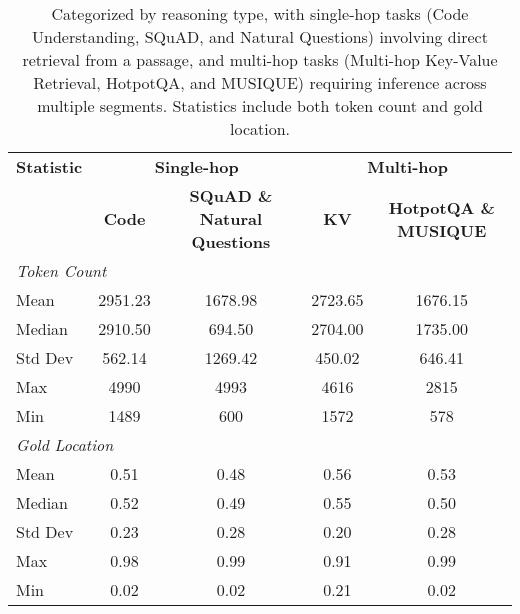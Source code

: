 \begin{table}[ht]
\centering
\small
\begin{tabular}{lcccc}
\toprule
\textbf{Statistic} & \multicolumn{2}{c}{\textbf{Single-hop}} & \multicolumn{2}{c}{\textbf{Multi-hop}} \\
\cmidrule(lr){2-3} \cmidrule(lr){4-5}
 & \textbf{Code} & \textbf{SQuAD \& Natural Questions}  & \textbf{KV} & \textbf{HotpotQA \& MUSIQUE} \\
\midrule
\multicolumn{5}{l}{\textit{Token Count}} \\
Mean     & 2951.23 & 1678.98 & 2723.65 & 1676.15  \\
Median   & 2910.50 & 694.50  & 2704.00 & 1735.00  \\
Std Dev  & 562.14  & 1269.42 & 450.02  & 646.41   \\
Max      & 4990    & 4993    & 4616    & 2815     \\
Min      & 1489    & 600     & 1572    & 578      \\
\midrule
\multicolumn{5}{l}{\textit{Gold Location}} \\
Mean   & 0.51    & 0.48    & 0.56    & 0.53     \\
Median & 0.52    & 0.49    & 0.55    & 0.50     \\
Std Dev& 0.23    & 0.28    & 0.20    & 0.28     \\
Max    & 0.98    & 0.99    & 0.91    & 0.99     \\
Min    & 0.02    & 0.02    & 0.21    & 0.02     \\
\bottomrule
\end{tabular}
\caption{Categorized by reasoning type, with single-hop tasks (Code Understanding, SQuAD, and Natural Questions) involving direct retrieval from a passage, and multi-hop tasks (Multi-hop Key-Value Retrieval, HotpotQA, and  MUSIQUE) requiring inference across multiple segments. Statistics include both token count and gold location.}
\label{tab:short_dataset_statistics}
\end{table}

